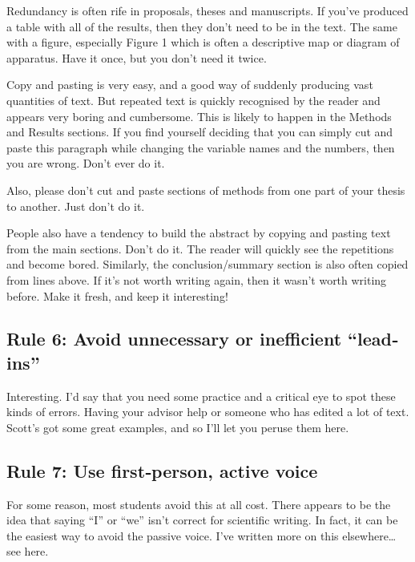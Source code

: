 \documentclass[
]{krantz}
\begin{document}
Redundancy is often rife in proposals, theses and manuscripts. If you've produced a table with all of the results, then they don't need to be in the text. The same with a figure, especially Figure 1 which is often a descriptive map or diagram of apparatus. Have it once, but you don't need it twice.

Copy and pasting is very easy, and a good way of suddenly producing vast quantities of text. But repeated text is quickly recognised by the reader and appears very boring and cumbersome. This is likely to happen in the Methods and Results sections. If you find yourself deciding that you can simply cut and paste this paragraph while changing the variable names and the numbers, then you are wrong. Don't ever do it.

Also, please don't cut and paste sections of methods from one part of your thesis to another. Just don't do it.

People also have a tendency to build the abstract by copying and pasting text from the main sections. Don't do it. The reader will quickly see the repetitions and become bored. Similarly, the conclusion/summary section is also often copied from lines above. If it's not worth writing again, then it wasn't worth writing before. Make it fresh, and keep it interesting!

\hypertarget{rule-6-avoid-unnecessary-or-inefficient-leadins}{%
\subsection{Rule 6: Avoid unnecessary or inefficient ``lead‐ins''}\label{rule-6-avoid-unnecessary-or-inefficient-leadins}}

Interesting. I'd say that you need some practice and a critical eye to spot these kinds of errors. Having your advisor help or someone who has edited a lot of text. Scott's got some great examples, and so I'll let you peruse them here.

\hypertarget{rule-7-use-firstperson-active-voice}{%
\subsection{Rule 7: Use first‐person, active voice}\label{rule-7-use-firstperson-active-voice}}

For some reason, most students avoid this at all cost. There appears to be the idea that saying ``I'' or ``we'' isn't correct for scientific writing. In fact, it can be the easiest way to avoid the passive voice. I've written more on this elsewhere\ldots{} see here.
\end{document}
